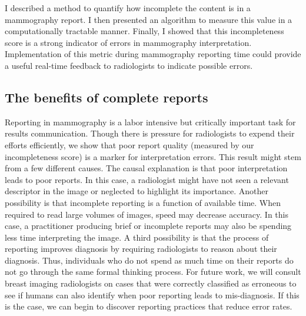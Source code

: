 I described a method to quantify how incomplete the content is in a mammography report. I then presented an algorithm to measure this value in a computationally tractable manner. Finally, I showed that this incompleteness score is a strong indicator of errors in mammography interpretation. Implementation of this metric during mammography reporting time could provide a useful real-time feedback to radiologists to indicate possible errors.

\subsection{The benefits of complete reports}
Reporting in mammography is a labor intensive but critically important task for results communication. Though there is pressure for radiologists to expend their efforts efficiently, we show that poor report quality (measured by our incompleteness score) is a marker for interpretation errors. This result might stem from a few different causes. The causal explanation is that poor interpretation leads to poor reports. In this case, a radiologist might have not seen a relevant descriptor in the image or neglected to highlight its importance. Another possibility is that incomplete reporting is a function of available time. When required to read large volumes of images, speed may decrease accuracy. In this case, a practitioner producing brief or incomplete reports may also be spending less time interpreting the image. A third possibility is that the process of reporting improves diagnosis by requiring radiologists to reason about their diagnosis. Thus, individuals who do not spend as much time on their reports do not go through the same formal thinking process. For future work, we will consult breast imaging radiologists on cases that were correctly classified as erroneous to see if humans can also identify when poor reporting leads to mis-diagnosis. If this is the case, we can begin to discover reporting practices that reduce error rates.

